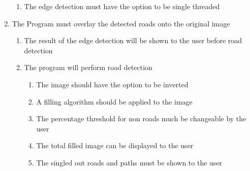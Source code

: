 \begin{flushleft}
\begin{enumerate}
\begin{enumerate}
                \item The edge detection must have the option to be single threaded
            \end{enumerate}
            
            \item The Program must overlay the detected roads onto the original image
            \begin{enumerate}
                \item The result of the edge detection will be shown to the user before road detection
                \item The program will perform road detection
                \begin{enumerate}
                    \item The image should have the option to be inverted
                    \item A filling algorithm should be applied to the image
                    \item The percentage threshold for non roads much be changeable by the user
                    \item The total filled image can be displayed to the user
                    \item The singled out roads and paths must be shown to the user
                \end{enumerate}
                
            \end{enumerate}
            

\end{enumerate}
\end{flushleft}
